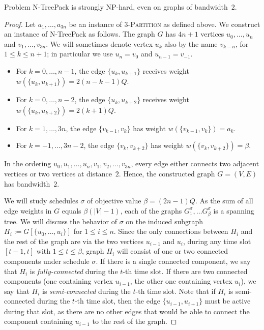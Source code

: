 \documentclass[runningheads]{llncs}
\newcommand{\set}[1]{\{ #1 \}}
\newcommand{\fromto}[2]{\set{#1, \ldots, #2}}
\newcommand{\xxxNTP}{{\sc N-TreePack}}
\begin{document}
\begin{theorem}
\label{thm:hardness_bandwidth}
Problem {\xxxNTP} is strongly NP-hard, even on graphs of bandwidth~$2$.
\end{theorem}
\begin{proof}
Let $a_1,\ldots,a_{3n}$ be an instance of \textsc{3-Partition} as defined above.
We construct an instance of {\xxxNTP} as follows.
The graph $G$ has $4n+1$ vertices $u_0,\ldots,u_n$ and $v_1,\ldots,v_{3n}$.
We will sometimes denote vertex $u_k$ also by the name $v_{k-n}$, for $1\le k\le n+1$;
in particular we use $u_n=v_0$ and $u_{n-1}=v_{-1}$.
\begin{itemize}
\item 
For $k=0,\ldots,n-1$,   the edge $\{u_k, u_{k+1}\}$ receives weight $w(\{u_k, u_{k+1}\}) = 2(n-k-1)Q$.
\item
For $k=0,\ldots,n-2$,   the edge $\{u_k, u_{k+2}\}$ receives weight $w(\{u_k, u_{k+2}\})=2(k+1)Q$.
\item 
For $k=1,\ldots,3n$,    the edge $\{v_{k-1}, v_k\}$ has weight $w(\{v_{k-1}, v_k\})=a_k$.
\item
For $k=-1,\ldots,3n-2$, the edge $\{v_k, v_{k+2}\}$ has weight $w(\{v_k, v_{k+2}\})=\beta$.  
\end{itemize}
In the ordering $u_0,u_1,\ldots,u_n,v_1,v_2,\ldots,v_{3n}$, every edge either connects two adjacent 
vertices or two vertices at distance~$2$. Hence, the constructed graph $G=(V,E)$ has bandwidth~$2$. 

We will study schedules $\sigma$ of objective value $\beta=(2n-1)Q$. 
As the sum of all edge weights in $G$ equals $\beta(|V|-1)$, each of the graphs 
$G^\sigma_1, \dots G^\sigma_\beta$ is a spanning tree.
We will discuss the behavior of $\sigma$ on the induced subgraph $H_i := G[\fromto{u_0}{u_i}]$ for $1\le i\le n$.
Since the only connections between $H_i$ and the rest of the graph are via the two vertices $u_{i-1}$ and $u_i$,
during any time slot $[t-1,t]$ with $1\le t\le\beta$, graph $H_i$ will consist of one or two connected components
under schedule $\sigma$.
If there is a single connected component, we say that $H_i$ is \emph{fully-connected} during the $t$-th time slot.
If there are two connected components (one containing vertex $u_{i-1}$, the other one containing 
vertex $u_i$), we say that $H_i$ is \emph{semi-connected} during the $t$-th time slot.
Note that if $H_i$ is semi-connected during the $t$-th time slot, then the edge $\{u_{i-1}, u_{i+1}\}$ must be 
active during that slot, as there are no other edges that would be able to connect the component containing 
$u_{i-1}$ to the rest of the graph.


\end{proof}
\end{document}
